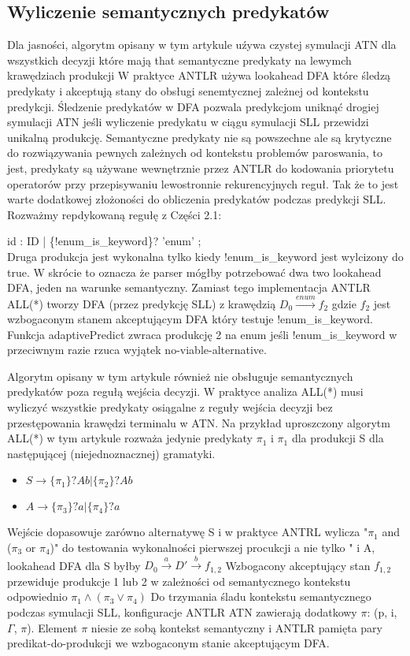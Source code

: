 \subsection{Wyliczenie semantycznych predykatów}
Dla jasności, algorytm opisany w tym artykule uźywa czystej
symulacji ATN dla wszystkich decyzji które mają that semantyczne predykaty
na lewymch krawędziach produkcji W praktyce ANTLR używa lookahead
DFA które śledzą predykaty i akceptują stany do obsługi senemtycznej
zależnej od kontekstu predykcji. Śledzenie predykatów w
DFA pozwala predykcjom uniknąć drogiej symulacji ATN jeśli
wyliczenie predykatu w ciągu symulacji SLL przewidzi unikalną
produkcję. Semantyczne predykaty nie są powszechne ale są krytyczne
do rozwiązywania pewnych zależnych od kontekstu problemów paroswania, to jest,
predykaty są używane wewnętrznie przez ANTLR do kodowania
priorytetu operatorów przy przepisywaniu lewostronnie rekurencyjnych reguł.
Tak że to jest warte dodatkowej złożoności do obliczenia
predykatów podczas predykcji SLL.
Rozważmy repdykowaną regułę z Części 2.1:
\par
id : ID | \{!enum_is_keyword\}? 'enum' ;
\\
Druga produkcja jest wykonalna tylko kiedy !enum_is_keyword
jest wylcizony do true. W skrócie to oznacza że parser mógłby
potrzebować dwa two lookahead DFA, jeden na warunke semantyczny.
Zamiast tego implementacja ANTLR ALL(*) tworzy DFA (przez
predykcję SLL) z krawędzią $D_0 \overset{enum}{\longrightarrow} f_2$
gdzie $f_2$ jest wzbogaconym stanem akceptującym DFA
który testuje !enum_is_keyword.
Funkcja adaptivePredict zwraca produkcję 2 na enum jeśli
!enum_is_keyword w przeciwnym razie rzuca wyjątek no-viable-alternative.
\par
Algorytm opisany w tym artykule również nie obsługuje
semantycznych predykatów poza regułą wejścia decyzji.
W praktyce analiza ALL(*) musi wyliczyć wszystkie predykaty osiągalne
z reguły wejścia decyzji bez przestępowania krawędzi terminalu
w ATN. Na przykład uproszczony algorytm ALL(*) w tym artykule rozważa jedynie
predykaty $\pi_1$ i $\pi_1$ dla produkcji S dla następującej (niejednoznacznej) gramatyki.
\begin{itemize}
\item $S\rightarrow \{\pi_1\}? Ab | \{\pi_2\}? Ab$
\item $A\rightarrow \{\pi_3\}? a | \{\pi_4\}? a$
\end{itemize}
Wejście dopasowuje zarówno alternatywę S i w praktyce
ANTRL wylicza "$\pi_1$ and ($\pi_3$ or $\pi_4$)" do testowania wykonalności
pierwszej procukcji a nie tylko "%
i A, lookahead DFA dla S byłby
$D_0\overset{a}{\rightarrow}D'\overset{b}{\rightarrow}f_{1,2}$
Wzbogacony akceptujący stan $f_{1,2}$ przewiduje produkcje
1 lub 2 w zależności od semantycznego kontekstu odpowiednio
$\pi_1 \wedge (\pi_3 \vee \pi_4)$
Do trzymania śladu kontekstu semantycznego podczas symulacji SLL,
konfiguracje ANTLR ATN
zawierają dodatkowy $\pi$: (p, i, $\Gamma$, $\pi$).
Element $\pi$ niesie ze sobą
kontekst semantyczny i ANTLR pamięta pary predikat-do-produkcji
we wzbogaconym stanie akceptującym DFA.